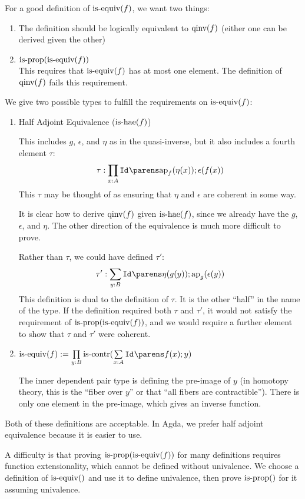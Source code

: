 \documentclass[11pt]{article}
\newcommand{\isequiv}[1]{\ensuremath{\textnormal{is-equiv}(#1)}}
\newcommand{\qinv}[1]{\ensuremath{\textnormal{qinv}(#1)}}
\newcommand{\isprop}[1]{\ensuremath{\textnormal{is-prop}(#1)}}
\newcommand{\iscontr}[1]{\ensuremath{\textnormal{is-contr}(#1)}}
\newcommand{\ishae}[1]{\ensuremath{\textnormal{is-hae}(#1)}}
\newcommand{\ap}{\textnormal{ap}}
\begin{document}
For a good definition of $\isequiv{f}$, we want two things:
\begin{enumerate}
\item The definition should be logically equivalent to $\qinv{f}$
  (either one can be derived given the other)
\item $\isprop{\isequiv{f}}$ \\
  This requires that $\isequiv{f}$ has at most one element.  The
  definition of $\qinv{f}$ fails this requirement.
\end{enumerate}

We give two possible types to fulfill the requirements on
$\isequiv{f}$:
\begin{enumerate}
\item Half Adjoint Equivalence ($\ishae{f}$)

  This includes $g$, $\epsilon$, and $\eta$ as in the quasi-inverse,
  but it also includes a fourth element $\tau$:
  \[\oftype{\tau}{\dfuntype{x}{A}{\idtype{}{\ap_f(\eta(x))}{\epsilon(f(x))}}}\]
  This $\tau$ may be thought of as ensuring that $\eta$ and $\epsilon$
  are coherent in some way.

  It is clear how to derive $\qinv{f}$ given $\ishae{f}$, since we
  already have the $g$, $\epsilon$, and $\eta$.  The other direction
  of the equivalence is much more difficult to prove.

  Rather than $\tau$, we could have defined $\tau'$:
  \[\oftype{\tau'}{\dpairtype{y}{B}{\idtype{}{\eta(g(y))}{\ap_g(\epsilon(y))}}}\]
  This definition is dual to the definition of $\tau$.  It is the
  other ``half'' in the name of the type.
  If the definition required both $\tau$ and $\tau'$, it would not
  satisfy the requirement of $\isprop{\isequiv{f}}$, and we would
  require a further element to show that $\tau$ and $\tau'$ were
  coherent.

\item $\isequiv{f} := \dfuntype{y}{B}{\iscontr{\dpairtype{x}{A}{\idtype{}{f(x)}{y}}}}$

  The inner dependent pair type is defining the pre-image of $y$ (in
  homotopy theory, this is the ``fiber over $y$'' or that ``all fibers
  are contractible'').  There is only one element in the pre-image,
  which gives an inverse function.
\end{enumerate}
Both of these definitions are acceptable.  In Agda, we prefer half
adjoint equivalence because it is easier to use.

A difficulty is that proving $\isprop{\isequiv{f}}$ for many
definitions requires function extensionality, which cannot be defined
without univalence.  We choose a definition of $\isequiv$ and use it
to define univalence, then prove $\isprop$ for it assuming univalence.
\end{document}
